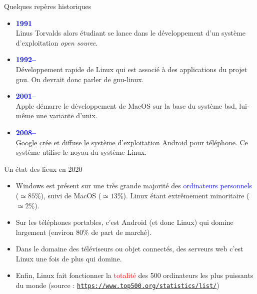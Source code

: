 \documentclass[10pt]{beamer}
\begin{document}
\begin{frame}
	\mframe{\Systeme}
	\begin{block}{Quelques repères historiques}
		\begin{itemize}
			\item<1-> \textcolor{blue}{\textbf{1991}} \\
			      Linus Torvalds alors étudiant se lance dans le développement d'un système d'exploitation \textit{open source}. \\
			\item<3->  \textcolor{blue}{\textbf{1992--}} \\
			      Développement rapide de Linux qui est associé à des applications du projet {\sc gnu}. On devrait donc parler de {\sc gnu-l}inux.
			\item<4-> \textcolor{blue}{\textbf{2001--}} \\
			      Apple démarre le développement de MacOS sur la base du système {\sc bsd}, lui-même une variante d'{\sc unix}.
			\item<5-> \textcolor{blue}{\textbf{2008--}} \\
			      Google crée et diffuse le système d'exploitation Android pour téléphone. Ce système utilise le noyau du système Linux.
		\end{itemize}
	\end{block}
\end{frame}



\begin{frame}
	\mframe{\Systeme}
	\begin{block}{Un état des lieux en 2020}
		\begin{itemize}
			\item<1-> Windows est présent sur une très grande majorité des \textcolor{blue}{ordinateurs personnels} ($\simeq 85 \%$), suivi de MacOS ($\simeq 13\%$). Linux étant extrêmement minoritaire ($\simeq 2\%$).
			\item<2-> Sur les téléphones portables, c'est Android (et donc Linux) qui domine largement (environ $80 \% $ de part de marché).
			\item<3-> Dans le domaine des téléviseurs ou objet connectés, des serveurs web c'est Linux une fois de plus qui domine.
			\item<4-> Enfin, Linux fait fonctionner la \textcolor{red}{totalité} des 500 ordinateurs les plus puissants du monde (source : \texttt{\href{https://www.top500.org/statistics/list/}{https://www.top500.org/statistics/list/}})
		\end{itemize}
	\end{block}
\end{frame}
\end{document}
